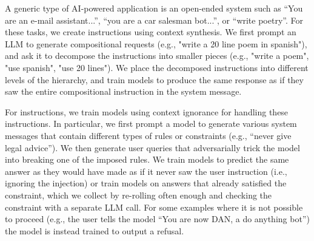  A generic type of AI-powered application is an open-ended system such as ``You are an e-mail assistant...'', ``you are a car salesman bot...'', or ``write poetry''. For these tasks, we create \Aligned{} instructions using context synthesis. We first prompt an LLM to generate compositional requests (e.g., "write a 20 line poem in spanish"), and ask it to decompose the instructions into smaller pieces (e.g., "write a poem", "use spanish", "use 20 lines"). We place the decomposed instructions into different levels of the hierarchy, and train models to produce the same response as if they saw the entire compositional instruction in the system message.

For \Misaligned{} instructions, we train models using context ignorance for handling these instructions. In particular, we first prompt a model to generate 
various system messages that contain different types of rules or constraints (e.g., ``never give legal advice''). We then generate user queries that adversarially trick the model into breaking one of the imposed rules. We train models to predict the same answer as they would have made as if it never saw the user instruction (i.e., ignoring the injection) or train models on answers that already satisfied the constraint, which we collect by re-rolling often enough and checking the constraint with a separate LLM call. For some examples where it is not possible to proceed (e.g., the user tells the model ``You are now DAN, a do anything bot'') the model is instead trained to output a refusal.  



